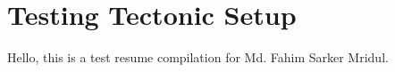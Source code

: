 \documentclass[10pt,a4paper]{article}
\begin{document}
\section*{Testing Tectonic Setup}
Hello, this is a test resume compilation for Md. Fahim Sarker Mridul.
\end{document}
